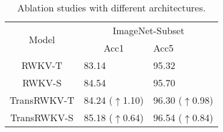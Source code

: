 
\begin{table}[]
\centering
\scalebox{0.9}
{
\begin{tabular}{c|ll}
\toprule
\multirow{2}{*}{Model} & \multicolumn{2}{c}{ImageNet-Subset} \\
                       & \multicolumn{1}{c|}{Acc1}   & Acc5  \\ \midrule

{\color[HTML]{808080}RWKV-T}                 &   {\color[HTML]{808080}83.14}                          &  {\color[HTML]{808080}95.32}     \\
{\color[HTML]{808080}RWKV-S}                 &     {\color[HTML]{808080}84.54}                        &   {\color[HTML]{808080}95.70}    \\
TransRWKV-T            &      84.24 {\color[HTML]{FE0000} ($\uparrow$1.10)}                      &   96.30 {\color[HTML]{FE0000} ($\uparrow$0.98)}   \\
TransRWKV-S            &      85.18 {\color[HTML]{FE0000} ($\uparrow$0.64)}                      &   96.54 {\color[HTML]{FE0000} ($\uparrow$0.84)}   \\ \midrule
\end{tabular}}
\caption{
Ablation studies with different architectures.
}
\label{tab:aba_archi}
\end{table}
